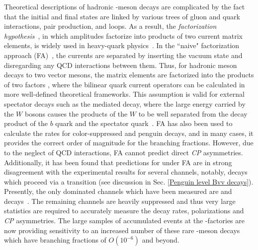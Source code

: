 Theoretical descriptions of hadronic \B-meson decays are complicated by the fact that the initial and final states are linked by various trees of gluon and quark interactions, pair production, and loops. As a result, the {\it factorization hypothesis}~\cite{Fact: Dugan}, in which amplitudes factorize into products of two current matrix elements, is widely used in heavy-quark physics~\cite{BBk}. In the ``naive" factorization approach (FA)~\cite{FA1,FA2}, the currents are separated by inserting the vacuum state and disregarding any QCD interactions between them. Thus, for hadronic \B meson decays to two vector mesons, the matrix elements \BvvBraKet are factorized into the products of two factors \BvvBraKetFact, where the bilinear quark current operators \JOneTwo can be calculated in more well-defined theoretical frameworks. This assumption is valid for external spectator decays such as the \bTocubard mediated \BToDPi decay, where the large energy carried by the $W$ bosons causes the products of the $W$ to be well separated from the decay product of the $b$ quark and the spectator quark~\cite{Stone, Fact: Dugan}. FA has also been used to calculate the rates for color-suppressed and penguin decays, and in many cases, it provides the correct order of magnitude for the branching fractions. However, due to the neglect of QCD interactions, FA cannot predict direct \textit{CP} asymmetries. Additionally, it has been found that predictions for \fL under FA are in strong disagreement with the experimental results for several channels, notably, decays which proceed via a \DsEqOne transition (see discussion in Sec. \ref{Penguin level Bvv decays}). Presently, the only \bsqq dominated \Bvv channels which have been measured are \BToPhiKst and \BToRhoKstz decays~\cite{belle_phiKstz,babar_phiKstz,belle_RhoPKstz,babar_RhoPKstz}. The remaining channels are heavily suppressed and thus very large statistics are required to accurately measure the decay rates, polarizations and \textit{CP} asymmetries. The large samples of accumulated \BBbar events at the \B-factories are now providing sensitivity to an increased number of these rare \B-meson decays which have branching fractions of $O(10^{-6})$ and beyond.

